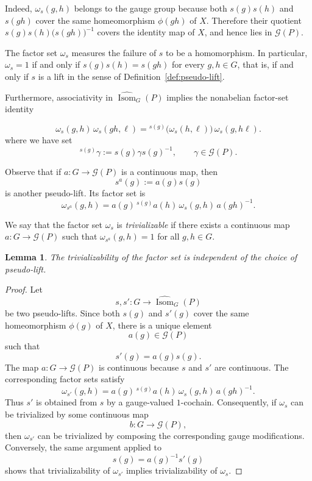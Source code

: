 \documentclass[11pt,a4paper]{article}
\numberwithin{equation}{section}
\newtheorem{lemma}[definition]{Lemma}
\theoremstyle{named}
\begin{document}
Indeed, \(\omega_s(g,h)\) belongs to the gauge group because both \(s(g)s(h)\) and \(s(gh)\) cover the same homeomorphism \(\phi(gh)\) of \(X\). Therefore their quotient \(s(g)s(h)\bigl(s(gh)\bigr)^{-1}\) covers the identity map of \(X\), and hence lies in \(\mathcal G(P)\).

The factor set \(\omega_s\) measures the failure of \(s\) to be a homomorphism. In particular, \(\omega_s=1\) if and only if \(s(g)s(h)=s(gh) \) for every \(g,h\in G\), that is, if and only if \(s\) is a lift in the sense of Definition~\ref{def:pseudo-lift}.

Furthermore, associativity in \(\widehat{\operatorname{Isom}}_G(P)\) implies the nonabelian factor-set identity

\[
\omega_s(g,h)\,\omega_s(gh,\ell)
=
{}^{s(g)}\!\bigl(\omega_s(h,\ell)\bigr)\,
\omega_s(g,h\ell).
\]
where we have set
\[
{}^{s(g)}\gamma
:=
s(g)\gamma s(g)^{-1},
\qquad
\gamma\in\mathcal G(P).
\]

Observe that if \(a:G\to \mathcal G(P)\) is a continuous map, then
\[
s^a(g):=a(g)s(g)
\]
is another pseudo-lift. Its factor set is
\[
\omega_{s^a}(g,h)
=
a(g)\,{}^{s(g)}a(h)\,\omega_s(g,h)\,a(gh)^{-1}.
\]

\begin{definition}\label{def:factor-set-trivializable}
We say that the factor set \(\omega_s\) is \emph{trivializable} if there exists a continuous map $a:G\to \mathcal G(P)$
such that $\omega_{s^a}(g,h)=1$
for all \(g,h\in G\).
\end{definition}


\begin{lemma}
\label{lem:trivializability-independent}
The trivializability of the factor set is independent of the choice of pseudo-lift.
\end{lemma}

\begin{proof}
Let
\[
s,s':G\longrightarrow \widehat{\operatorname{Isom}}_G(P)
\]
be two pseudo-lifts. Since both \(s(g)\) and \(s'(g)\) cover the same homeomorphism \(\phi(g)\) of \(X\), there is a unique element
\[
a(g)\in \mathcal G(P)
\]
such that
\[
s'(g)=a(g)s(g).
\]
The map \(a:G\to\mathcal G(P)\) is continuous because \(s\) and \(s'\) are
continuous. The corresponding factor sets satisfy
\[
\omega_{s'}(g,h)
=
a(g)\,{}^{s(g)}a(h)\,\omega_s(g,h)\,a(gh)^{-1}.
\]
Thus \(s'\) is obtained from \(s\) by a gauge-valued \(1\)-cochain. Consequently, if \(\omega_s\) can be trivialized by some continuous map
\[
b:G\to\mathcal G(P),
\]
then \(\omega_{s'}\) can be trivialized by composing the corresponding gauge modifications. Conversely, the same argument applied to
\[
s(g)=a(g)^{-1}s'(g)
\]
shows that trivializability of \(\omega_{s'}\) implies trivializability of \(\omega_s\). 
\end{proof}
\end{document}
